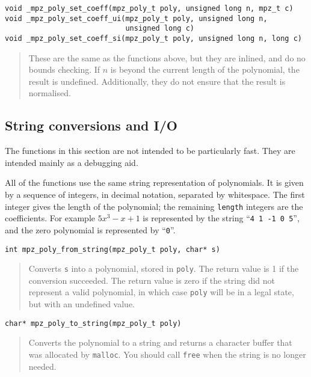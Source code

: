 \documentclass[a4paper,10pt]{article}
\newcommand{\code}{\lstinline}
\begin{document}
\begin{lstlisting}
void _mpz_poly_set_coeff(mpz_poly_t poly, unsigned long n, mpz_t c)
void _mpz_poly_set_coeff_ui(mpz_poly_t poly, unsigned long n,
                            unsigned long c)
void _mpz_poly_set_coeff_si(mpz_poly_t poly, unsigned long n, long c)
\end{lstlisting}
\begin{quote}
These are the same as the functions above, but they are inlined, and do no bounds checking. If $n$ is beyond the current length of the polynomial, the result is undefined. Additionally, they do not ensure that the result is normalised.
\end{quote}


\subsection{String conversions and I/O}

The functions in this section are not intended to be particularly fast. They are intended mainly as a debugging aid.

All of the functions use the same string representation of polynomials. It is given by a sequence of integers, in decimal notation, separated by whitespace. The first integer gives the length of the polynomial; the remaining \code{length} integers are the coefficients. For example $5x^3 - x + 1$ is represented by the string ``\code{4 1 -1 0 5}'', and the zero polynomial is represented by ``\code{0}''.

\begin{lstlisting}
int mpz_poly_from_string(mpz_poly_t poly, char* s)
\end{lstlisting}
\begin{quote}
Converts \code{s} into a polynomial, stored in \code{poly}. The return value is 1 if the conversion succeeded. The return value is zero if the string did not represent a valid polynomial, in which case \code{poly} will be in a legal state, but with an undefined value.
\end{quote}

\begin{lstlisting}
char* mpz_poly_to_string(mpz_poly_t poly)
\end{lstlisting}
\begin{quote}
Converts the polynomial to a string and returns a character buffer that was allocated by \code{malloc}. You should call \code{free} when the string is no longer needed.
\end{quote}
\end{document}
